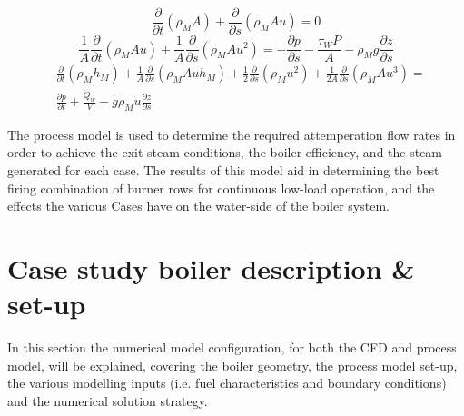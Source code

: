 \documentclass[review]{elsarticle}
\begin{document}
\begin{equation}\label{eqn_mix_conti}
\frac{\partial}{\partial t}(\rho_M A)+\frac{\partial}{\partial s}(\rho_MAu) = 0
\end{equation}
\begin{equation}\label{eqn_mix_mom}
\frac{1}{A} \frac{\partial}{\partial t}(\rho_M A u)+\frac{1}{A} \frac{\partial}{\partial s}(\rho_M A u^2) = -\frac{\partial p}{\partial s}-\frac{\tau_W P}{A}- \rho_M g \frac{\partial z}{\partial s}
\end{equation}
\begin{equation}\label{eqn_mix_energy}
\begin{split}
&\frac{\partial}{\partial t}(\rho_Mh_M)+\frac{1}{A}\frac{\partial}{\partial s}(\rho_MAuh_M)+\frac{1}{2}\frac{\partial}{\partial s}(\rho_Mu^2)+\frac{1}{2A}\frac{\partial}{\partial s}(\rho_MAu^3)=\\&\frac{\partial p}{\partial t} + \frac{\dot{Q}_w}{V}-g\rho_Mu\frac{\partial z}{\partial s}
\end{split}
\end{equation}

The process model is used to determine the required attemperation flow rates in order to achieve the exit steam conditions, the boiler efficiency, and the steam generated for each case. The results of this model aid in determining the best firing combination of burner rows for continuous low-load operation, and the effects the various Cases have on the water-side of the boiler system.

\section{Case study boiler description \& set-up}
In this section the numerical model configuration, for both the CFD and process model, will be explained, covering the boiler geometry, the process model set-up, the various  modelling inputs (i.e. fuel characteristics and boundary conditions) and the numerical solution strategy.
\end{document}
